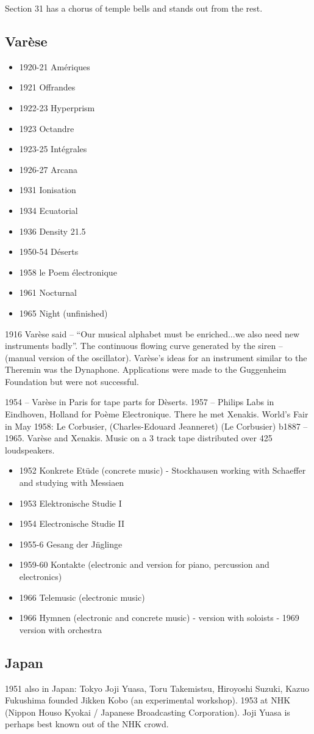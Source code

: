 Section 31 has a chorus of temple bells and stands out from the rest.


\subsection{Var\`ese}
\begin{itemize}
\item 1920-21		Am\'eriques
\item 1921		Offrandes
\item 1922-23		Hyperprism
\item 1923		Octandre
\item 1923-25		Int\'egrales
\item 1926-27		Arcana
\item 1931		Ionisation
\item 1934		Ecuatorial
\item 1936		Density 21.5
\item 1950-54		D\'eserts
\item 1958		le Poem \'electronique
\item 1961		Nocturnal
\item 1965		Night (unfinished)
\end{itemize}

1916 Var\`ese said – ``Our musical alphabet must be enriched...we also need new instruments badly''.  The continuous flowing curve generated by the siren – (manual version of the oscillator). Var\`ese's ideas for an instrument similar to the Theremin was the Dynaphone.  Applications were made to the Guggenheim Foundation but were not successful. 

1954 – Var\`ese in Paris for tape parts for D\`eserts. 1957 – Philips Labs in Eindhoven, Holland for Poème Electronique.  There he met Xenakis. World's Fair in May 1958: Le Corbusier, (Charles-Edouard Jeanneret) (Le Corbusier) b1887 – 1965. Var\`ese and Xenakis. Music on a 3 track tape distributed over 425 loudspeakers.

\begin{itemize}
\item 1952 Konkrete Et\"ude (concrete music) - Stockhausen working with Schaeffer and studying with Messiaen
\item 1953 Elektronische Studie I
\item 1954 Electronische Studie II
\item 1955-6 Gesang der J\"nglinge
\item 1959-60 Kontakte (electronic and version for piano, percussion and electronics)
\item 1966 Telemusic (electronic music)
\item 1966 Hymnen (electronic and concrete music) - version with soloists - 1969 version with orchestra
\end{itemize}

\subsection{Japan}
1951 also in Japan: Tokyo
Joji Yuasa, Toru Takemistsu, Hiroyoshi Suzuki, Kazuo Fukushima founded Jikken Kobo (an experimental workshop). 1953 at NHK (Nippon Houso Kyokai / Japanese Broadcasting Corporation).  Joji Yuasa is perhaps best known out of the NHK crowd.

